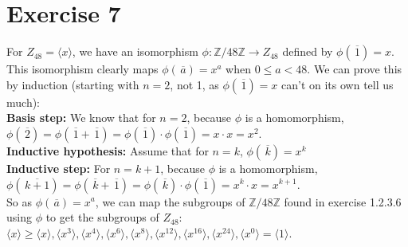 \documentclass{article}
\newcommand{\Z}{\mathbb{Z}}
\newcommand{\olsi}[1]{\,\overline{\!{#1}}}
\begin{document}
    \section*{Exercise 7}
    For $Z_{48} = \langle x \rangle$,
    we have an isomorphism $\phi: \Z/48\Z \to Z_{48}$
    defined by $\phi(\olsi{1}) = x$. \\
    This isomorphism clearly maps $\phi(\olsi{a}) = x^a$
    when $0 \leqslant a < 48$.
    We can prove this by induction
    (starting with $n = 2$, not 1, as
    $\phi(\olsi{1}) = x$ can't on its own tell us much): \\
    \textbf{Basis step:}
    We know that for $n = 2$,
    because $\phi$ is a homomorphism,
    $\phi(\olsi{2}) = \phi(\olsi{1} + \olsi{1})
    = \phi(\olsi{1}) \cdot \phi(\olsi{1}) = x \cdot x = x^2$. \\
    \textbf{Inductive hypothesis:}
    Assume that for $n = k$, $\phi(\olsi{k}) = x^k$ \\ 
    \textbf{Inductive step:}
    For $n = k + 1$, because $\phi$ is a homomorphism,
    $\phi(\olsi{k + 1}) = \phi(\olsi{k} + \olsi{1})
    = \phi(\olsi{k}) \cdot \phi(\olsi{1}) = x^k \cdot x = x^{k+1}$. \\
    So as $\phi(\olsi{a}) = x^a$,
    we can map the subgroups of $\Z/48\Z$ found in exercise 1.2.3.6
    using $\phi$ to get the subgroups of $Z_48$: \\
    $\langle x \rangle \geqslant
    \langle x \rangle,
    \langle x^3 \rangle,
    \langle x^4 \rangle,
    \langle x^6 \rangle,
    \langle x^8 \rangle,
    \langle x^{12} \rangle,
    \langle x^{16} \rangle,
    \langle x^{24} \rangle,
    \langle x^0 \rangle = \langle 1 \rangle$.
    
\end{document}
